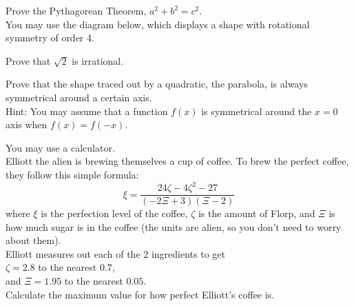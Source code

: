 \documentclass{exam}
\begin{document}
\begin{questions}
    \newpage

    \question Prove the Pythagorean Theorem, $a^2+b^2=c^2$.\\
    You may use the diagram below, which displays a shape with rotational symmetry of order 4.\\
    \newpage

    \question Prove that $\sqrt{2}$ is irrational.
    \newpage

    \question Prove that the shape traced out by a quadratic, the parabola, is always symmetrical around a certain axis.\\
    Hint: You may assume that a function $f(x)$ is symmetrical around the $x=0$ axis when $f(x)=f(-x)$.
    \newpage

    \question You may use a calculator.\\
    Elliott the alien is brewing themselves a cup of coffee. To brew the perfect coffee, they follow this simple formula:
    \begin{equation*}
        \xi = \frac{24\zeta -4\zeta^2 -27}{(-2\Xi+3)(\Xi-2)}
    \end{equation*}
    where $\xi$ is the perfection level of the coffee, $\zeta$ is the amount of Florp, and $\Xi$ is how much sugar is in the coffee (the units are alien, so you don't need to worry about them).\\
    Elliott measures out each of the 2 ingredients to get\\ $\zeta = 2.8$ to the nearest $0.7$,\\ and $\Xi=1.95$ to the nearest $0.05$.\\
    Calculate the maximum value for how perfect Elliott's coffee is.
    \newpage


\end{questions}
\end{document}
